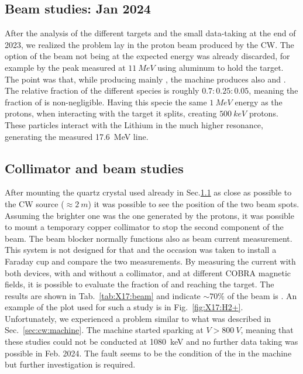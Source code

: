 \begin{refsection}
    \section{Beam studies: Jan 2024}
    \label{sec:X17:H2+}
        After the analysis of the different targets and the small data-taking at the end of 2023, we realized the problem lay in the proton beam produced by the CW.
        The option of the beam not being at the expected energy was already discarded, for example by the peak measured at $\SI{11}{MeV}$ using aluminum to hold the target.
        The point was that, while producing mainly , the machine produces also  and .
        The relative fraction of the different species is roughly $0.7:0.25:0.05$, meaning the fraction of  is non-negligible.
        Having this specie the same $\SI{1}{MeV}$ energy as the protons, when interacting with the target it splits, creating  $\SI{500}{keV}$ protons.
        These particles interact with the Lithium in the much higher resonance, generating the measured \SI{17.6}{MeV} line. 
    
        \subsection{Collimator and beam studies}
        After mounting the quartz crystal used already in Sec.\ref{} as close as possible to the CW source ($\approx \SI{2}{m}$) it was possible to see the position of the two beam spots.
        Assuming the brighter one was the one generated by the protons, it was possible to mount a temporary copper collimator to stop the second component of the beam.
        The beam blocker normally functions also as beam current measurement. 
        This system is not designed for that and the occasion was taken to install a Faraday cup and compare the two measurements. 
        By measuring the current with both devices, with and without a collimator, and at different COBRA magnetic fields, it is possible to evaluate the fraction of  and  reaching the target. 
        The results are shown in Tab.~\ref{tab:X17:beam} and indicate $\sim70\%$ of the beam is .
        An example of the plot used for such a study is in Fig.~\ref{fig:X17:H2+}.\\

        \noindent
        Unfortunately, we experienced a problem similar to what was described in Sec.~\ref{sec:cw:machine}. 
        The machine started sparking at $V>\SI{800}{V}$, meaning that these studies could not be conducted at \SI{1080}{keV} and no further data taking was possible in Feb. 2024.
        The fault seems to be the condition of the  in the machine but further investigation is required.


\end{refsection}
